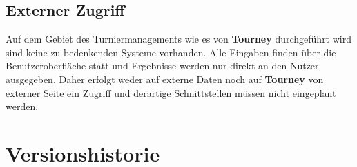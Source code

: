 \documentclass[11pt]{article}
\begin{document}

\subsection{Externer Zugriff}

Auf dem Gebiet des Turniermanagements wie es von \textbf{Tourney} durchgeführt wird sind keine zu bedenkenden Systeme vorhanden. Alle Eingaben finden über die Benutzeroberfläche statt und Ergebnisse werden nur direkt an den Nutzer ausgegeben. Daher erfolgt weder auf externe Daten noch auf \textbf{Tourney} von externer Seite ein Zugriff und derartige Schnittstellen müssen nicht eingeplant werden.

\section{Versionshistorie}
\end{document}
